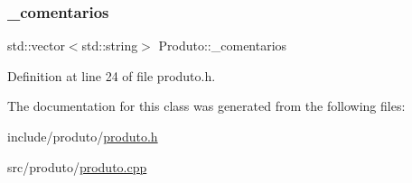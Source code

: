 \subsubsection{\texorpdfstring{\+\_\+comentarios}{\_comentarios}}
{\footnotesize\ttfamily std\+::vector$<$std\+::string$>$ Produto\+::\+\_\+comentarios}



Definition at line 24 of file produto.\+h.



The documentation for this class was generated from the following files\+:\begin{DoxyCompactItemize}
\item 
include/produto/\hyperlink{produto_8h}{produto.\+h}\item 
src/produto/\hyperlink{produto_8cpp}{produto.\+cpp}\end{DoxyCompactItemize}
